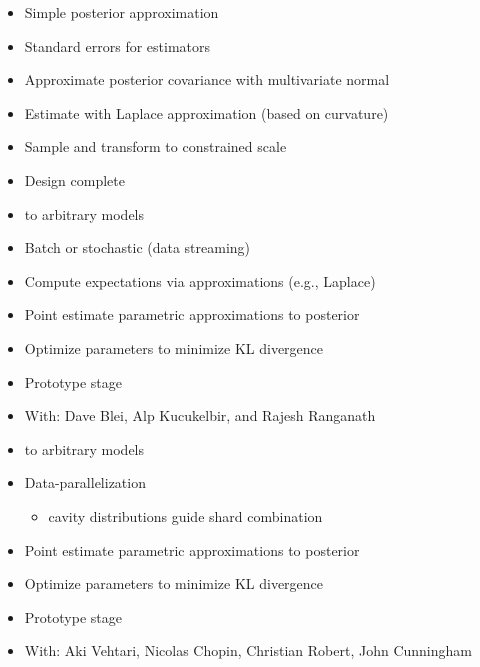 \documentclass[10pt]{report}
\newcommand{\sld}[1]{\newpage{\noindent\LARGE \ \ \
    \textcolor{MidnightBlue}{\bfseries #1}}\vspace*{4pt}}
\newcommand{\spc}{\hspace*{0.25in}}
\newcommand{\myemph}[1]{{\color{MidnightBlue}{\bfseries #1}}}
\newcommand{\mypart}[2]{{\newpage 
\mbox{ }
\vfill
\noindent\spc\color{MidnightBlue}{\LARGE\bfseries #1\\[10pt]\spc\Huge{#2}}
\vfill\vfill}
\mbox{ }}
\begin{document}
\sld{MLE \& MML Errors}
\begin{itemize}
\item Simple posterior approximation
\item Standard errors for estimators
\item Approximate posterior covariance with multivariate normal
\item Estimate with Laplace approximation (based on curvature)
\item Sample and transform to constrained scale
\vfill
\item Design complete
\end{itemize}




\sld{Variational Bayes (VB)}
\begin{itemize}
\item \myemph{Black box} to \myemph{scale} arbitrary models
\item Batch or stochastic (data streaming)
\item Compute expectations via approximations (e.g., Laplace)
\item Point estimate parametric approximations to posterior
\item Optimize parameters to minimize KL divergence
\vfill
\item Prototype stage 
\item {\footnotesize With: Dave Blei, Alp Kucukelbir, and Rajesh Ranganath}
\end{itemize}

\sld{Expectation Propagation (EP)}
\begin{itemize}
\item \myemph{Black box} to \myemph{scale} arbitrary models
\item Data-parallelization
\vspace*{-4pt}
\begin{itemize}\small
\item cavity distributions guide shard combination
\end{itemize}
\item Point estimate parametric approximations to posterior
\item Optimize parameters to minimize KL divergence
\vfill
\item Prototype stage
\item {\footnotesize With: Aki Vehtari, Nicolas Chopin, Christian Robert,
  John Cunningham}
\end{itemize}


\mypart{}{The End}
\end{document}
